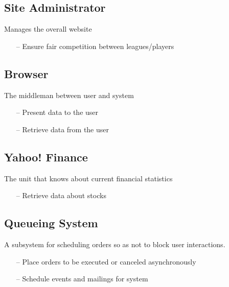 \subsection{Site Administrator}
Manages the overall website
\begin{itemize}
\item[--] Ensure fair competition between leagues/players
\end{itemize}

\subsection{Browser}
The middleman between user and system
\begin{itemize}
\item[--] Present data to the user
\item[--] Retrieve data from the user
\end{itemize}

\subsection{Yahoo! Finance}
The unit that knows about current financial statistics
\begin{itemize}
\item[--] Retrieve data about stocks
\end{itemize}

\subsection{Queueing System}
A subsystem for scheduling orders so as not to block user
interactions.
\begin{itemize}
\item[--] Place orders to be executed or canceled asynchronously
\item[--] Schedule events and mailings for system
\end{itemize}
